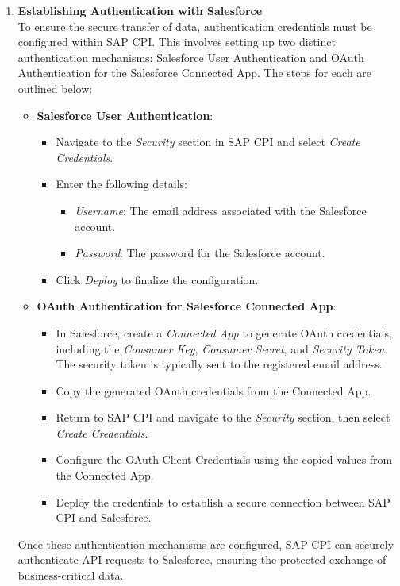 \begin{enumerate}
    \item \textbf{Establishing Authentication with Salesforce} \\
    To ensure the secure transfer of data, authentication credentials must be configured within SAP CPI. This involves setting up two distinct authentication mechanisms: Salesforce User Authentication and OAuth Authentication for the Salesforce Connected App. The steps for each are outlined below:
    \begin{itemize}
        \item \textbf{Salesforce User Authentication}:
        \begin{itemize}
            \item Navigate to the \textit{Security} section in SAP CPI and select \textit{Create Credentials}.
            \item Enter the following details:
            \begin{itemize}
                \item \textit{Username}: The email address associated with the Salesforce account.
                \item \textit{Password}: The password for the Salesforce account.
            \end{itemize}
            \item Click \textit{Deploy} to finalize the configuration.
        \end{itemize}
        \item \textbf{OAuth Authentication for Salesforce Connected App}:
        \begin{itemize}
            \item In Salesforce, create a \textit{Connected App} to generate OAuth credentials, including the \textit{Consumer Key}, \textit{Consumer Secret}, and \textit{Security Token}. The security token is typically sent to the registered email address.
            \item Copy the generated OAuth credentials from the Connected App.
            \item Return to SAP CPI and navigate to the \textit{Security} section, then select \textit{Create Credentials}.
            \item Configure the OAuth Client Credentials using the copied values from the Connected App.
            \item Deploy the credentials to establish a secure connection between SAP CPI and Salesforce.
        \end{itemize}
    \end{itemize}
    Once these authentication mechanisms are configured, SAP CPI can securely authenticate API requests to Salesforce, ensuring the protected exchange of business-critical data.
\end{enumerate}

